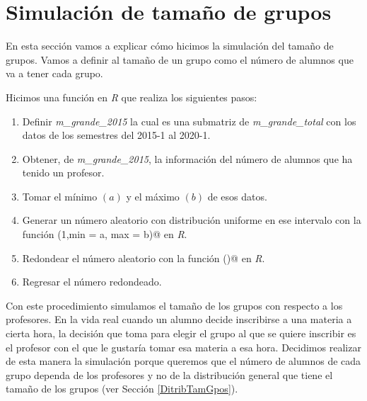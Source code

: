 


\section{Simulación de tamaño de grupos} \label{SimTamGpos}

En esta sección vamos a explicar cómo hicimos la simulación del tamaño de grupos. Vamos a definir al tamaño de un grupo como el número de alumnos que va a tener cada grupo.

Hicimos una función en \textit{R} que realiza los siguientes pasos:
  
  \begin{enumerate}
\item Definir \textit{m\_grande\_2015} la cual es una submatriz de \textit{m\_grande\_total} con los datos de los semestres del 2015-1 al 2020-1.

\item Obtener, de \textit{m\_grande\_2015}, la información del número de alumnos que ha tenido un profesor.

\item Tomar el mínimo $(a)$ y el máximo $(b)$ de esos datos.

\item Generar un número aleatorio con distribución uniforme en ese intervalo con la función \verb@runif(1,min = a, max = b)@ en \textit{R}.

\item Redondear el número aleatorio con la función \verb@ceiling()@ en \textit{R}.

\item Regresar el número redondeado.
\end{enumerate}

Con este procedimiento simulamos el tamaño de los grupos con respecto a los profesores. En la vida real cuando un alumno decide inscribirse a una materia a cierta hora, la decisión que toma para elegir el grupo al que se quiere inscribir es el profesor con el que le gustaría tomar esa materia a esa hora. Decidimos realizar de esta manera la simulación porque queremos que el número de alumnos de cada grupo dependa de los profesores y no de la distribución general que tiene el tamaño de los grupos (ver Sección \ref{DitribTamGpos}).




